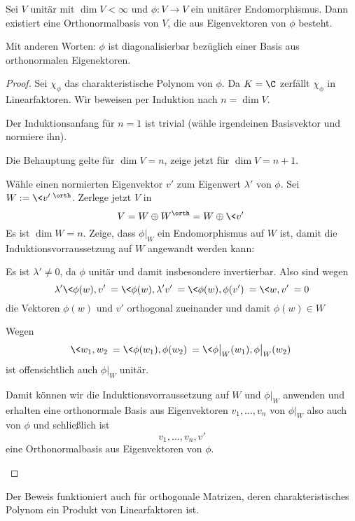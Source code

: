 \documentclass{mycourse}
\begin{document}
\begin{thm}
	\label{thm:13.20}
	Sei $V$ unitär mit $\dim V<\infty$ und $\phi:V\to V$ ein unitärer Endomorphismus.
	Dann existiert eine Orthonormalbasis von $V$, die aus Eigenvektoren von $\phi$ besteht.
	\begin{note}
		Mit anderen Worten: $\phi$ ist diagonalisierbar bezüglich einer Basis aus orthonormalen Eigenektoren.
	\end{note}
	\begin{proof}
		Sei $\chi_\phi$ das charakteristische Polynom von $\phi$.
		Da $K=\C$ zerfällt $\chi_\phi$ in Linearfaktoren.
		Wir beweisen per Induktion nach $n = \dim V$.

		Der Induktionsanfang für $n=1$ ist trivial (wähle irgendeinen Basisvektor und normiere ihn).
		
		\begin{seg}[Induktionsschritt]
			Die Behauptung gelte für $\dim V=n$, zeige jetzt für $\dim V=n+1$.

			Wähle einen normierten Eigenvektor $v'$ zum Eigenwert $\lambda'$ von $\phi$.
			Sei $W := \<v'\>^\orth$.
			Zerlege jetzt $V$ in
			\[
				V = W \oplus W^\orth = W \oplus \<v'\>
			\]
			Es ist $\dim W = n$.
			Zeige, dass $\phi\big|_W$ ein Endomorphismus auf $W$ ist, damit die Induktionsvorraussetzung auf $W$ angewandt werden kann:

			\begin{seg}
				Es ist $\lambda'\neq 0$, da $\phi$ unitär und damit insbesondere invertierbar.
				Also sind wegen
				\[
					\lambda' \<\phi(w),v'\> = \<\phi(w),\lambda'v'\> = \<\phi(w),\phi(v')\> = \<w,v'\> = 0
				\]
				die Vektoren $\phi(w)$ und $v'$ orthogonal zueinander und damit $\phi(w)\in W$				
			\end{seg}
			Wegen
			\[
				\<w_1,w_2\> = \<\phi(w_1),\phi(w_2)\> = \<\phi\big|_W(w_1),\phi\big|_W(w_2)\>
			\]
			ist offensichtlich auch $\phi|_W$ unitär.

			Damit können wir die Induktionsvorraussetzung auf $W$ und $\phi|_W$ anwenden und erhalten eine orthonormale Basis aus Eigenvektoren $v_1,\dotsc,v_n$ von $\phi|_W$ also auch von $\phi$ und schließlich ist
			\[
				v_1,\dotsc, v_n, v'
			\]
			eine Orthonormalbasis aus Eigenvektoren von $\phi$.
		\end{seg}
	\end{proof}
	\begin{note}
		Der Beweis funktioniert auch für orthogonale Matrizen, deren charakteristisches Polynom ein Produkt von Linearfaktoren ist.
	\end{note}
\end{thm}
\end{document}
